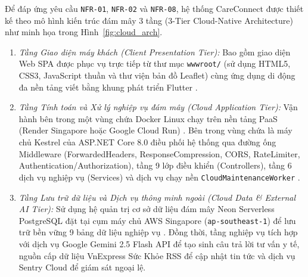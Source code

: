 Để đáp ứng yêu cầu \texttt{NFR-01}, \texttt{NFR-02} và \texttt{NFR-08}, hệ thống CareConnect được thiết kế theo mô hình kiến trúc đám mây 3 tầng (3-Tier Cloud-Native Architecture) như minh họa trong Hình~\ref{fig:cloud_arch}.
\begin{enumerate}
    \item \textit{Tầng Giao diện máy khách (Client Presentation Tier):} Bao gồm giao diện Web SPA được phục vụ trực tiếp từ thư mục \texttt{wwwroot/} (sử dụng HTML5, CSS3, JavaScript thuần và thư viện bản đồ Leaflet) cùng ứng dụng di động đa nền tảng viết bằng khung phát triển Flutter \cite{google2024flutter}.
    \item \textit{Tầng Tính toán và Xử lý nghiệp vụ đám mây (Cloud Application Tier):} Vận hành bên trong một vùng chứa Docker Linux chạy trên nền tảng PaaS (Render Singapore hoặc Google Cloud Run) \cite{merkel2014docker}. Bên trong vùng chứa là máy chủ Kestrel của ASP.NET Core 8.0 điều phối hệ thống qua đường ống Middleware (ForwardedHeaders, ResponseCompression, CORS, RateLimiter, Authentication/Authorization), tầng 9 lớp điều khiển (Controllers), tầng 6 dịch vụ nghiệp vụ (Services) và dịch vụ chạy nền \texttt{CloudMaintenanceWorker} \cite{microsoft2024aspnet}.
    \item \textit{Tầng Lưu trữ dữ liệu và Dịch vụ thông minh ngoài (Cloud Data \& External AI Tier):} Sử dụng hệ quản trị cơ sở dữ liệu đám mây Neon Serverless PostgreSQL đặt tại cụm máy chủ AWS Singapore (\texttt{ap-southeast-1}) để lưu trữ bền vững 9 bảng dữ liệu nghiệp vụ \cite{postgresql2024docs}. Đồng thời, tầng nghiệp vụ tích hợp với dịch vụ Google Gemini 2.5 Flash API để tạo sinh câu trả lời tư vấn y tế, nguồn cấp dữ liệu VnExpress Sức Khỏe RSS để cập nhật tin tức và dịch vụ Sentry Cloud để giám sát ngoại lệ.
\end{enumerate}

